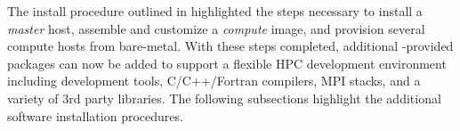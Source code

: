The install procedure outlined in highlighted the
steps necessary to install a {\em master} host, assemble and customize a {\em
  compute} image, and provision several compute hosts from bare-metal. With
these steps completed, additional \OHPC{}-provided packages can now be added to
support a flexible HPC development environment including development tools,
C/C++/Fortran compilers, MPI stacks, and a variety of 3rd party libraries. The
following subsections highlight the additional software installation
procedures.

